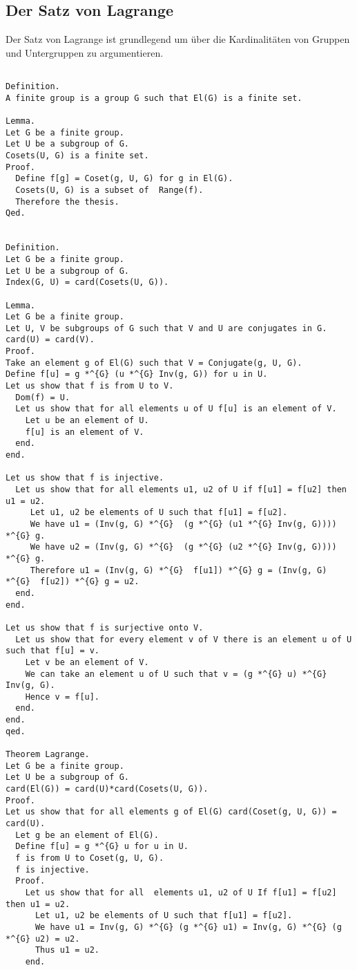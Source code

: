 \documentclass[a4paper,12pt]{scrartcl}
\begin{document}
\subsection{Der Satz von Lagrange}

Der Satz von Lagrange ist grundlegend um über die Kardinalitäten von Gruppen und Untergruppen zu argumentieren.


\begin{lstlisting}

Definition.
A finite group is a group G such that El(G) is a finite set.

Lemma.
Let G be a finite group.
Let U be a subgroup of G.
Cosets(U, G) is a finite set.
Proof.
  Define f[g] = Coset(g, U, G) for g in El(G).
  Cosets(U, G) is a subset of  Range(f).
  Therefore the thesis.
Qed.


Definition.
Let G be a finite group.
Let U be a subgroup of G.
Index(G, U) = card(Cosets(U, G)).

Lemma.
Let G be a finite group.
Let U, V be subgroups of G such that V and U are conjugates in G.
card(U) = card(V).
Proof.
Take an element g of El(G) such that V = Conjugate(g, U, G).
Define f[u] = g *^{G} (u *^{G} Inv(g, G)) for u in U.
Let us show that f is from U to V.
  Dom(f) = U.
  Let us show that for all elements u of U f[u] is an element of V.
    Let u be an element of U.
    f[u] is an element of V.
  end.
end.

Let us show that f is injective.
  Let us show that for all elements u1, u2 of U if f[u1] = f[u2] then u1 = u2.
     Let u1, u2 be elements of U such that f[u1] = f[u2].
     We have u1 = (Inv(g, G) *^{G}  (g *^{G} (u1 *^{G} Inv(g, G)))) *^{G} g.
     We have u2 = (Inv(g, G) *^{G}  (g *^{G} (u2 *^{G} Inv(g, G)))) *^{G} g.
     Therefore u1 = (Inv(g, G) *^{G}  f[u1]) *^{G} g = (Inv(g, G) *^{G}  f[u2]) *^{G} g = u2.
  end.
end.

Let us show that f is surjective onto V.
  Let us show that for every element v of V there is an element u of U such that f[u] = v.
    Let v be an element of V.
    We can take an element u of U such that v = (g *^{G} u) *^{G} Inv(g, G).
    Hence v = f[u].
  end.
end.
qed.

Theorem Lagrange.
Let G be a finite group.
Let U be a subgroup of G.
card(El(G)) = card(U)*card(Cosets(U, G)).
Proof.
Let us show that for all elements g of El(G) card(Coset(g, U, G)) = card(U).
  Let g be an element of El(G).
  Define f[u] = g *^{G} u for u in U.
  f is from U to Coset(g, U, G).
  f is injective.
  Proof.
    Let us show that for all  elements u1, u2 of U If f[u1] = f[u2] then u1 = u2.
      Let u1, u2 be elements of U such that f[u1] = f[u2].
      We have u1 = Inv(g, G) *^{G} (g *^{G} u1) = Inv(g, G) *^{G} (g *^{G} u2) = u2.
      Thus u1 = u2.
    end.


\end{lstlisting}
\end{document}
